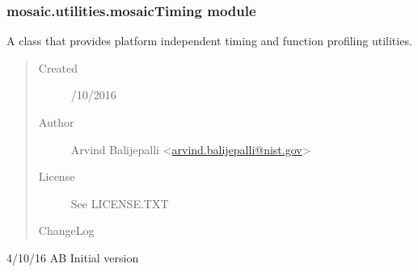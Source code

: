 \documentclass[letterpaper,10pt,english]{sphinxmanual}
\begin{document}
\subsubsection{mosaic.utilities.mosaicTiming module}
\label{api-doc/mosaic.misc:mosaic-utilities-mosaictiming-module}\label{api-doc/mosaic.misc:module-mosaic.utilities.mosaicTiming}
A class that provides platform independent timing and function profiling utilities.
\begin{quote}\begin{description}
\item[{Created}] /10/2016

\item[{Author}] \leavevmode
Arvind Balijepalli \textless{}\href{mailto:arvind.balijepalli@nist.gov}{arvind.balijepalli@nist.gov}\textgreater{}

\item[{License}] \leavevmode
See LICENSE.TXT

\item[{ChangeLog}] \leavevmode
\end{description}\end{quote}

\begin{DUlineblock}{0em}
\item[] 4/10/16         AB      Initial version
\end{DUlineblock}
\end{document}
